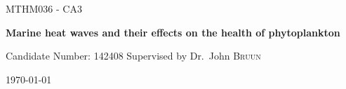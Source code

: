\begin{titlepage}
	\centering
	\vspace{0.25cm}
	{\scshape\Large MTHM036 - CA3\par}
	\vspace{0.5cm}
	{\huge\bfseries Marine heat waves and their effects on the health of phytoplankton \par}
	{\Large Candidate Number: 142408}
	\vspace{0.2cm}
	\flushleft
	Supervised by	Dr.~John \textsc{Bruun} \hfill	{\large \today\par}
    \par
    \centering
	\par
    

    \vfill
\end{titlepage}